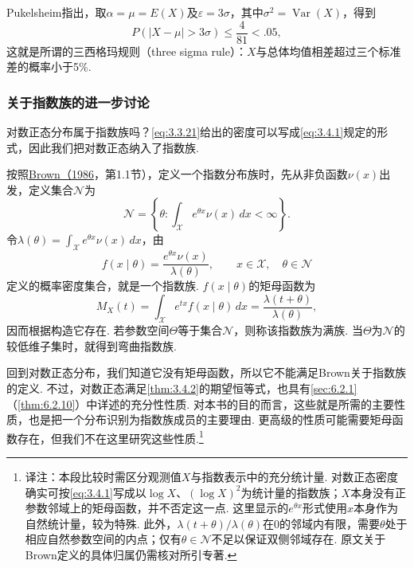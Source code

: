 
Pukelsheim指出，取$\alpha=\mu=E(X)$及$\varepsilon=3\sigma$，其中$\sigma^2=\operatorname{Var}(X)$，得到
$$P(|X-\mu|>3\sigma)\le\frac4{81}<.05,$$
这就是所谓的三西格玛规则（three sigma rule）：$X$与总体均值相差超过三个标准差的概率小于5\%.

\subsubsection{关于指数族的进一步讨论}\label{sec:3.8.3}
对数正态分布属于指数族吗？\eqref{eq:3.3.21}给出的密度可以写成\eqref{eq:3.4.1}规定的形式，因此我们把对数正态纳入了指数族.

按照\hyperref[bib:source50]{Brown（1986}，第1.1节），定义一个指数分布族时，先从非负函数$\nu(x)$出发，定义集合$\mathcal N$为
$$\mathcal N=\left\{\theta:\int_{\mathcal X}e^{\theta x}\nu(x)\,dx<\infty\right\}.$$
令$\lambda(\theta)=\int_{\mathcal X}e^{\theta x}\nu(x)\,dx$，由
$$f(x\mid\theta)=\frac{e^{\theta x}\nu(x)}{\lambda(\theta)},\qquad x\in\mathcal X,\quad\theta\in\mathcal N$$
定义的概率密度集合，就是一个指数族. $f(x\mid\theta)$的矩母函数为
$$M_X(t)=\int_{\mathcal X}e^{tx}f(x\mid\theta)\,dx=\frac{\lambda(t+\theta)}{\lambda(\theta)},$$
因而根据构造它存在. 若参数空间$\Theta$等于集合$\mathcal N$，则称该指数族为满族. 当$\Theta$为$\mathcal N$的较低维子集时，就得到弯曲指数族.

回到对数正态分布，我们知道它没有矩母函数，所以它不能满足Brown关于指数族的定义. 不过，对数正态满足\autoref{thm:3.4.2}的期望恒等式，也具有\autoref{sec:6.2.1}（\autoref{thm:6.2.10}）中详述的充分性性质. 对本书的目的而言，这些就是所需的主要性质，也是把一个分布识别为指数族成员的主要理由. 更高级的性质可能需要矩母函数存在，但我们不在这里研究这些性质.\footnote{译注：本段比较时需区分观测值$X$与指数表示中的充分统计量. 对数正态密度确实可按\eqref{eq:3.4.1}写成以$\log X$、$(\log X)^2$为统计量的指数族；$X$本身没有正参数邻域上的矩母函数，并不否定这一点. 这里显示的$e^{\theta x}$形式使用$x$本身作为自然统计量，较为特殊. 此外，$\lambda(t+\theta)/\lambda(\theta)$在$0$的邻域内有限，需要$\theta$处于相应自然参数空间的内点；仅有$\theta\in\mathcal N$不足以保证双侧邻域存在. 原文关于Brown定义的具体归属仍需核对所引专著.}
